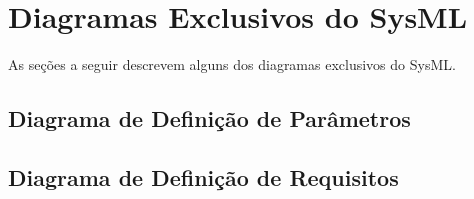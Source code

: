 \section{Diagramas Exclusivos do SysML}
As seções a seguir descrevem alguns dos diagramas exclusivos do SysML.

\subsection{Diagrama de Definição de Parâmetros}


\subsection{Diagrama de Definição de Requisitos}





